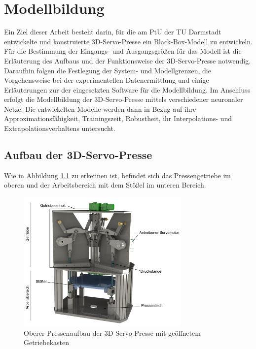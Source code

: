 \chapter{Modellbildung}

Ein Ziel dieser Arbeit besteht darin, für die am PtU der TU Darmstadt entwickelte und konstruierte 3D-Servo-Presse ein Black-Box-Modell zu entwickeln. Für die Bestimmung der Eingangs- und Ausgangsgrößen für das Modell ist die Erläuterung des Aufbaus und der Funktionsweise der 3D-Servo-Presse notwendig. Daraufhin folgen die Festlegung der System- und Modellgrenzen, die Vorgehensweise bei der experimentellen Datenermittlung und einige Erläuterungen zur der eingesetzten Software für die Modellbildung. Im Anschluss erfolgt die Modellbildung der 3D-Servo-Presse mittels verschiedener neuronaler Netze. Die entwickelten Modelle werden dann in Bezug auf ihre Approximationsfähigkeit, Trainingszeit, Robustheit, ihr Interpolations- und Extrapolationsverhaltens untersucht.

\section{Aufbau der 3D-Servo-Presse}

Wie in Abbildung \ref{fig:3d-servo} zu erkennen ist, befindet sich das Pressengetriebe im oberen und der Arbeitsbereich mit dem Stößel im unteren Bereich.

\begin{figure} [h]
	\centering
	\includegraphics[width=0.75\textwidth]{images/3D-Servo-Presse}
	\caption{Oberer Pressenaufbau der 3D-Servo-Presse mit geöffnetem Getriebekasten \cite{Rakowitsch.2018}}
	\label{fig:3d-servo}
\end{figure}

